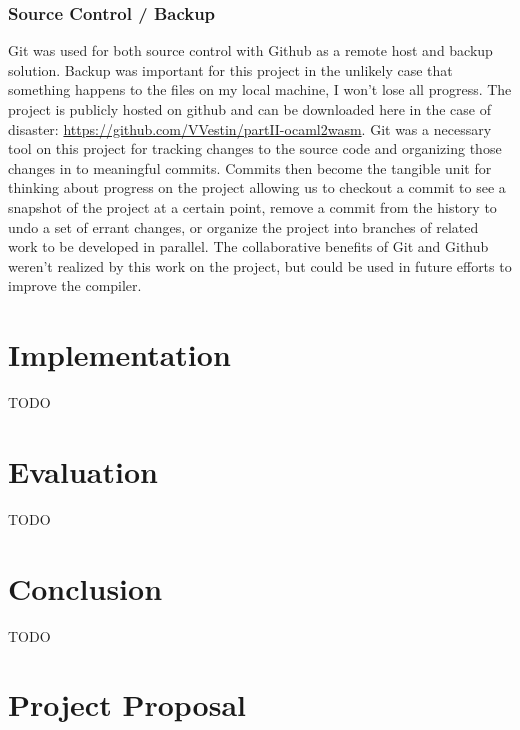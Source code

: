\documentclass[12pt,a4paper,twoside,openright]{report}
\begin{document}
\subsection{Source Control / Backup}
Git was used for both source control with Github as a remote host and backup solution.
Backup was important for this project in the unlikely case that something happens to the files on my local machine, I won't lose all progress.
The project is publicly hosted on github and can be downloaded here in the case of disaster: \url{https://github.com/VVestin/partII-ocaml2wasm}.
Git was a necessary tool on this project for tracking changes to the source code and organizing those changes in to meaningful commits.
Commits then become the tangible unit for thinking about progress on the project allowing us to checkout a commit to see a snapshot of the project at a certain point, remove a commit from the history to undo a set of errant changes, or organize the project into branches of related work to be developed in parallel.
The collaborative benefits of Git and Github weren't realized by this work on the project, but could be used in future efforts to improve the compiler.

\chapter{Implementation}

TODO

\chapter{Evaluation}

TODO

\chapter{Conclusion}

TODO



\appendix

\chapter{Project Proposal}

% 
\end{document}
